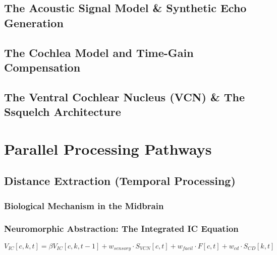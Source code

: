 \documentclass[12pt,a4paper]{report}
\begin{document}
\section{The Acoustic Signal Model \& Synthetic Echo Generation}

\section{The Cochlea Model and Time-Gain Compensation}

\section{The Ventral Cochlear Nucleus (VCN) \& The Ssquelch Architecture}

\chapter{Parallel Processing Pathways}
\label{ch:pathways}

\section{Distance Extraction (Temporal Processing)}
    \subsection{Biological Mechanism in the Midbrain}
    \subsection{Neuromorphic Abstraction: The Integrated IC Equation}
    \begin{equation}
        V_{IC}[c, k, t] = \beta V_{IC}[c, k, t-1] + w_{sensory} \cdot S_{VCN}[c, t] + w_{facil} \cdot F[c, t] + w_{cd} \cdot S_{CD}[k, t]
    \end{equation}
\end{document}

